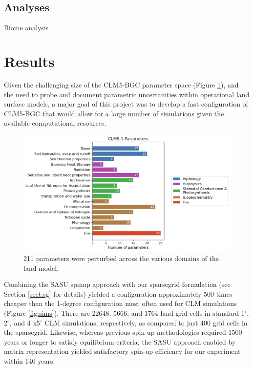 \documentclass[draft]{agujournal2019}
\begin{document}
\subsection{Analyses}

Biome analysis

\section{Results}

Given the challenging size of the CLM5-BGC parameter space (Figure \ref{fig:params}), and the need to probe and document parametric uncertainties within operational land surface models, a major goal of this project was to develop a fast configuration of CLM5-BGC that would allow for a large number of simulations given the available computational resources.


\begin{figure}[h]
\centering
\includegraphics[width=\textwidth]{../figs/main/bar.png}
\caption{211 parameters were perturbed across the various domains of the land model.}
\label{fig:params}
\end{figure}


Combining the SASU spinup approach with our sparsegrid formulation (see Section \ref{sect:sg} for details) yielded a configuration approximately 500 times cheaper than the 1-degree configuration most often used for CLM simulations (Figure \ref{fig:sims}).
There are 22648, 5666, and 1764 land grid cells in standard 1$^{\circ}$, 2$^{\circ}$, and 4$^{\circ}$x5$^{\circ}$ CLM simulations, respectively, as compared to just 400 grid cells in the sparsegrid.
Likewise, whereas previous spin-up methodologies required 1500 years or longer to satisfy equilibrium criteria, the SASU approach enabled by matrix representation yielded satisfactory spin-up efficiency for our experiment within 140 years.
\end{document}
